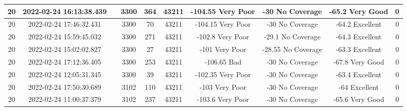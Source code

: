 \begin{longtable*}{|c|c|c|c|c|c|c|c|c|c|}
20&2022-02-24 16:13:38.439&&3300&364&43211& -104.55   Very Poor   & -30       No Coverage & -65.2     Very Good   & 0\\\hline
{}20&2022-02-24 17:46:32.431&&3300&70&43211& -104.15   Very Poor   & -30       No Coverage & -64.2     Excellent   & 0\\\hline
{}20&2022-02-24 15:59:45.032&&3300&271&43211& -102.8    Very Poor   & -29.1     No Coverage & -64.3     Excellent   & 0\\\hline
{}20&2022-02-24 15:02:02.827&&3300&27&43211& -101      Very Poor   & -28.55    No Coverage & -63.3     Excellent   & 0\\\hline
{}20&2022-02-24 17:12:36.405&&3300&253&43211& -106.65   Bad         & -30       No Coverage & -67.8     Very Good   & 0\\\hline
{}20&2022-02-24 12:05:31.345&&3300&39&43211& -102.35   Very Poor   & -30       No Coverage & -63.4     Excellent   & 0\\\hline
{}20&2022-02-24 17:50:30.689&&3102&110&43211& -103      Very Poor   & -30       No Coverage & -64       Excellent   & 0\\\hline
{}20&2022-02-24 11:00:37.379&&3102&237&43211& -103.6    Very Poor   & -30       No Coverage & -65.6     Very Good   & 0\\\hline

\end{longtable*}
